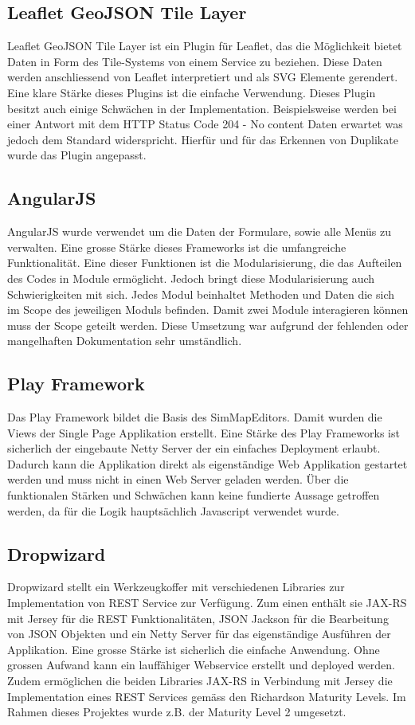 \subsection*{Leaflet GeoJSON Tile Layer}
Leaflet GeoJSON Tile Layer ist ein Plugin für Leaflet, das die Möglichkeit bietet Daten in Form des Tile-Systems von einem Service zu beziehen. Diese Daten werden anschliessend von Leaflet interpretiert und als SVG Elemente gerendert. Eine klare Stärke dieses Plugins ist die einfache Verwendung. Dieses Plugin besitzt auch einige Schwächen in der Implementation. Beispielsweise werden bei einer Antwort mit dem HTTP Status Code 204 - No content Daten erwartet was jedoch dem Standard widerspricht. Hierfür und für das Erkennen von Duplikate wurde das Plugin angepasst.
\subsection*{AngularJS}
AngularJS wurde verwendet um die Daten der Formulare, sowie alle Menüs zu verwalten. Eine grosse Stärke dieses Frameworks ist die umfangreiche Funktionalität. Eine dieser Funktionen ist die Modularisierung, die das Aufteilen des Codes in Module ermöglicht. Jedoch bringt diese Modularisierung auch Schwierigkeiten mit sich. Jedes Modul beinhaltet Methoden und Daten die sich im Scope des jeweiligen Moduls befinden. Damit zwei Module interagieren können muss der Scope geteilt werden. Diese Umsetzung war aufgrund der fehlenden oder mangelhaften Dokumentation sehr umständlich.
\subsection*{Play Framework}
Das Play Framework bildet die Basis des SimMapEditors. Damit wurden die Views der Single Page Applikation erstellt. Eine Stärke des Play Frameworks ist sicherlich der eingebaute Netty Server der ein einfaches Deployment erlaubt. Dadurch kann die Applikation direkt als eigenständige Web Applikation gestartet werden und muss nicht in einen Web Server geladen werden. Über die funktionalen Stärken und Schwächen kann keine fundierte Aussage getroffen werden, da für die Logik hauptsächlich Javascript verwendet wurde.
\subsection*{Dropwizard}
Dropwizard stellt ein Werkzeugkoffer mit verschiedenen Libraries zur Implementation von REST Service zur Verfügung. Zum einen enthält sie JAX-RS mit Jersey für die REST Funktionalitäten, JSON Jackson für die Bearbeitung von JSON Objekten und ein Netty Server für das eigenständige Ausführen der Applikation. Eine grosse Stärke ist sicherlich die einfache Anwendung. Ohne grossen Aufwand kann ein lauffähiger Webservice erstellt und deployed werden. Zudem ermöglichen die beiden Libraries JAX-RS in Verbindung mit Jersey die Implementation eines REST Services gemäss den Richardson Maturity Levels. Im Rahmen dieses Projektes wurde z.B. der Maturity Level 2 umgesetzt.
